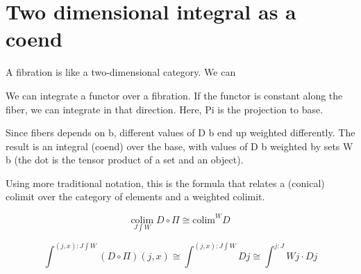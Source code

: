 \documentclass[11pt]{amsart}
\begin{document}
\section{Two dimensional integral as a coend}

A fibration is like a two-dimensional category. We can 

We can integrate a functor over a fibration. If the functor is constant along the fiber, we can integrate in that direction. Here, Pi is the projection to base.

Since fibers depends on b, different values of D b end up weighted differently. The result is an integral (coend) over the base, with values of D b weighted by sets W b (the dot is the tensor product of a set and an object).

Using more traditional notation, this is the formula that relates a (conical) colimit over the category of elements and a weighted colimit.

\[\underset{J \int W}{\mbox{colim}} \; D \circ \Pi  \cong \mbox{colim}^W D\]

\[\int^{(j, x) \colon J\int W} (D \circ \Pi) (j, x) \cong \int^{(j, x) \colon J\int W} D j  \cong   \int^{j \colon J} W j \cdot D j\]
\end{document}
